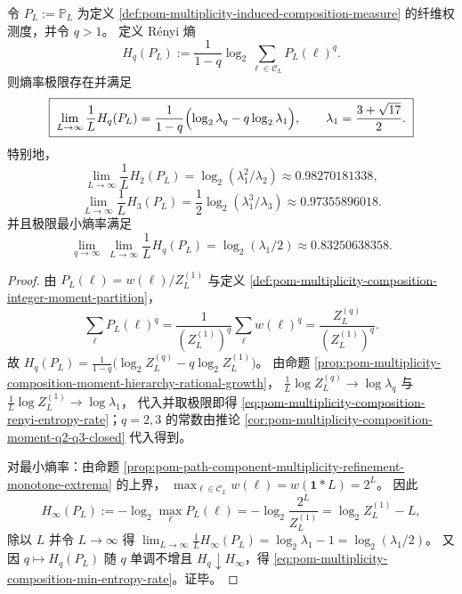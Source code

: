 \begin{proposition}\label{prop:pom-multiplicity-composition-renyi-entropy-rate}
令 \(P_L:=\mathbb{P}_L\) 为定义 \ref{def:pom-multiplicity-induced-composition-measure} 的纤维权测度，并令 \(q>1\)。
定义 Rényi 熵
\[
H_q(P_L):=\frac{1}{1-q}\log_2\sum_{\boldsymbol{\ell}\in\mathcal{C}_L}P_L(\boldsymbol{\ell})^{q}.
\]
则熵率极限存在并满足
\begin{equation}\label{eq:pom-multiplicity-composition-renyi-entropy-rate}
\boxed{\;
\lim_{L\to\infty}\frac{1}{L}H_q(P_L)
=\frac{1}{1-q}\Bigl(\log_2\lambda_q-q\log_2\lambda_1\Bigr),\qquad
\lambda_1=\frac{3+\sqrt{17}}{2}.\;}
\end{equation}
特别地，
\[
\boxed{\;
\lim_{L\to\infty}\frac{1}{L}H_2(P_L)=\log_2(\lambda_1^2/\lambda_2)\approx 0.98270181338,\;}
\]
\[
\boxed{\;
\lim_{L\to\infty}\frac{1}{L}H_3(P_L)=\frac12\log_2(\lambda_1^3/\lambda_3)\approx 0.97355896018.\;}
\]
并且极限最小熵率满足
\begin{equation}\label{eq:pom-multiplicity-composition-min-entropy-rate}
\boxed{\;
\lim_{q\to\infty}\ \lim_{L\to\infty}\frac{1}{L}H_q(P_L)
=\log_2(\lambda_1/2)\approx 0.83250638358.\;}
\end{equation}
\end{proposition}
\begin{proof}
由 \(P_L(\boldsymbol{\ell})=w(\boldsymbol{\ell})/Z_L^{(1)}\) 与定义 \ref{def:pom-multiplicity-composition-integer-moment-partition}，
\[
\sum_{\boldsymbol{\ell}}P_L(\boldsymbol{\ell})^q
=\frac{1}{(Z_L^{(1)})^q}\sum_{\boldsymbol{\ell}}w(\boldsymbol{\ell})^q
=\frac{Z_L^{(q)}}{(Z_L^{(1)})^q}.
\]
故
\(
H_q(P_L)=\frac{1}{1-q}\bigl(\log_2 Z_L^{(q)}-q\log_2 Z_L^{(1)}\bigr)
\)。
由命题 \ref{prop:pom-multiplicity-composition-moment-hierarchy-rational-growth}，
\(
\frac{1}{L}\log Z_L^{(q)}\to \log\lambda_q
\)
与
\(
\frac{1}{L}\log Z_L^{(1)}\to \log\lambda_1
\)，
代入并取极限即得 \eqref{eq:pom-multiplicity-composition-renyi-entropy-rate}；\(q=2,3\) 的常数由推论 \ref{cor:pom-multiplicity-composition-moment-q2-q3-closed} 代入得到。
\par
对最小熵率：由命题 \ref{prop:pom-path-component-multiplicity-refinement-monotone-extrema} 的上界，
\(
\max_{\boldsymbol{\ell}\in\mathcal{C}_L}w(\boldsymbol{\ell})=w(\boldsymbol{1}*L)=2^L
\)。
因此
\[
H_\infty(P_L):=-\log_2\max_{\boldsymbol{\ell}}P_L(\boldsymbol{\ell})
=-\log_2\frac{2^L}{Z_L^{(1)}}=\log_2 Z_L^{(1)}-L,
\]
除以 \(L\) 并令 \(L\to\infty\) 得
\(
\lim_{L\to\infty}\frac{1}{L}H_\infty(P_L)=\log_2\lambda_1-1=\log_2(\lambda_1/2)
\)。
又因 \(q\mapsto H_q(P_L)\) 随 \(q\) 单调不增且 \(H_q\downarrow H_\infty\)，得 \eqref{eq:pom-multiplicity-composition-min-entropy-rate}。证毕。
\end{proof}

